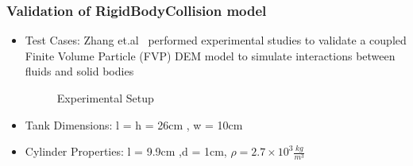 \documentclass{beamer}
\begin{document}
  \begin{frame} %
  \frametitle{Validation of RigidBodyCollision model}
  \begin{itemize}\pause

  	 \item Test Cases: Zhang et.al\footnotemark ~ performed experimental studies to validate a coupled Finite Volume Particle (FVP) DEM model to simulate interactions between fluids and solid bodies 
 	   \begin{figure}
 	   \caption{Experimental Setup}
 	   \end{figure}
 	   \item Tank Dimensions: l = h = 26cm , w = 10cm
 	   \item Cylinder Properties: l = 9.9cm ,d = 1cm, $\rho =2.7 \times 10^{3} \frac{kg}{m^3} $
    \end{itemize}
    
  \end{frame}
  
\end{document}
